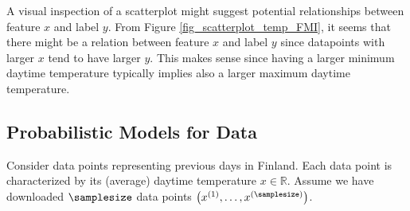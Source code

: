 \documentclass[12pt]{report}
\begin{document}
A visual inspection of a scatterplot might suggest potential relationships between feature $x$ 
and label $y$. From Figure \ref{fig_scatterplot_temp_FMI}, it seems that there might be a relation 
between feature $x$ and label $y$ since datapoints with larger $x$ tend to have larger $y$. This 
makes sense since having a larger minimum daytime temperature typically implies also a larger 
maximum daytime temperature. 



\subsection{Probabilistic Models for Data} 
Consider data points representing previous days in Finland. Each data point is 
characterized by its (average) daytime temperature $x \in \mathbb{R}$. Assume we 
have downloaded $\samplesize$ data points $\big(x^{(1)},\ldots,x^{(\samplesize)} \big)$. 
\end{document}
